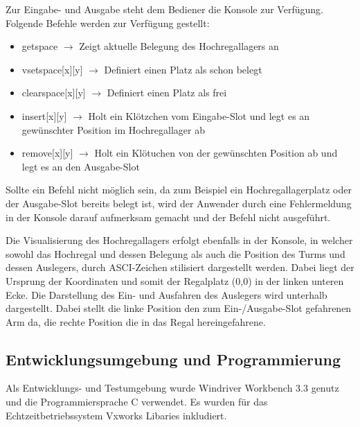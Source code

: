 Zur Eingabe- und Ausgabe steht dem Bediener die Konsole zur Verfügung.
\newline\newline
Folgende Befehle werden zur Verfügung gestellt:
\begin{itemize} 
	\item getspace $\rightarrow$ Zeigt aktuelle Belegung des Hochregallagers an
	\item vsetspace[x][y] $\rightarrow$ Definiert einen Platz als schon belegt
	\item clearspace[x][y] $\rightarrow$ Definiert einen Platz als frei
	\item insert[x][y] $\rightarrow$ Holt ein Klötzchen vom Eingabe-Slot und legt es an gewünschter Position im Hochregallager ab
	\item remove[x][y] $\rightarrow$ Holt ein Klötuchen von der gewünschten Position ab und legt es an den Ausgabe-Slot
\end{itemize}

Sollte ein Befehl nicht möglich sein, da zum Beispiel ein Hochregallagerplatz oder der Ausgabe-Slot bereits belegt ist, wird der Anwender durch eine Fehlermeldung in der Konsole darauf aufmerksam gemacht und der Befehl nicht ausgeführt.

Die Visualisierung des Hochregallagers erfolgt ebenfalls in der Konsole, in welcher sowohl das Hochregal und dessen Belegung als auch die Position des Turms und dessen Auslegers, durch ASCI-Zeichen stilisiert dargestellt werden.
Dabei liegt der Ursprung der Koordinaten und somit der Regalplatz (0,0) in der linken unteren Ecke.
Die Darstellung des Ein- und Ausfahren des Auslegers wird unterhalb dargestellt. Dabei stellt die linke Position den zum Ein-/Ausgabe-Slot gefahrenen Arm da, die rechte Position die in das Regal hereingefahrene.

\subsection{Entwicklungsumgebung und Programmierung}
Als Entwicklungs- und Testumgebung wurde Windriver Workbench 3.3 genutz und die Programmiersprache C verwendet.
Es wurden für das Echtzeitbetriebssystem Vxworks Libaries inkludiert.


